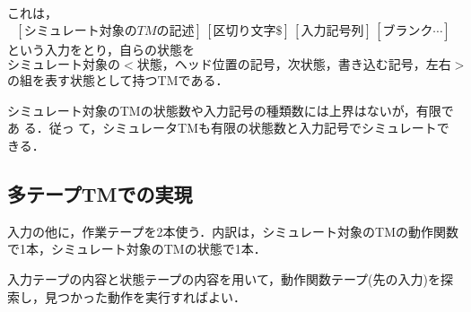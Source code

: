 これは，
\[
 [シミュレート対象のTMの記述]\, [区切り文字\$]\, [入力記号列]\, [ブランク \cdots]
\]
という入力をとり，自らの状態を
\[
 シミュレート対象の <状態，ヘッド位置の記号，次状態，書き込む記号，左右>
\]
の組を表す状態として持つTMである．

シミュレート対象のTMの状態数や入力記号の種類数には上界はないが，有限であ
る．従っ
て，シミュレータTMも有限の状態数と入力記号でシミュレートできる．

\subsection{多テープTMでの実現}
入力の他に，作業テープを2本使う．内訳は，シミュレート対象のTMの動作関数
で1本，シミュレート対象のTMの状態で1本．

入力テープの内容と状態テープの内容を用いて，動作関数テープ(先の入力)を探
索し，見つかった動作を実行すればよい．

